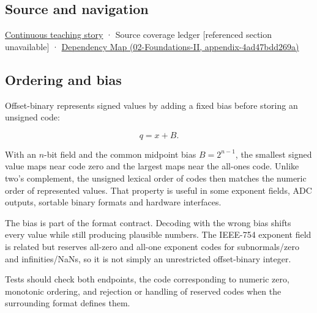 \subsection{Source and navigation}\label{appendix-53a8cfb25f8d-source-and-navigation}

\hyperref[01-foundations-i-ch001-choosing-what-information-to-keep]{Continuous teaching story} · {Source coverage ledger {[}referenced section unavailable{]}} · \href{../02-Foundations-II/main.pdf\#nameddest=appendix-4ad47bdd269a}{Dependency Map (02-Foundations-II, appendix-4ad47bdd269a)}

\subsection{Ordering and bias}\label{appendix-53a8cfb25f8d-ordering-and-bias}

Offset-binary represents signed values by adding a fixed bias before storing an unsigned code:

\[q=x+B.\]

With an \(n\)-bit field and the common midpoint bias \(B=2^{n-1}\), the smallest signed value maps near code zero and the largest maps near the all-ones code. Unlike two's complement, the unsigned lexical order of codes then matches the numeric order of represented values. That property is useful in some exponent fields, ADC outputs, sortable binary formats and hardware interfaces.

The bias is part of the format contract. Decoding with the wrong bias shifts every value while still producing plausible numbers. The IEEE-754 exponent field is related but reserves all-zero and all-one exponent codes for subnormals/zero and infinities/NaNs, so it is not simply an unrestricted offset-binary integer.

Tests should check both endpoints, the code corresponding to numeric zero, monotonic ordering, and rejection or handling of reserved codes when the surrounding format defines them.
